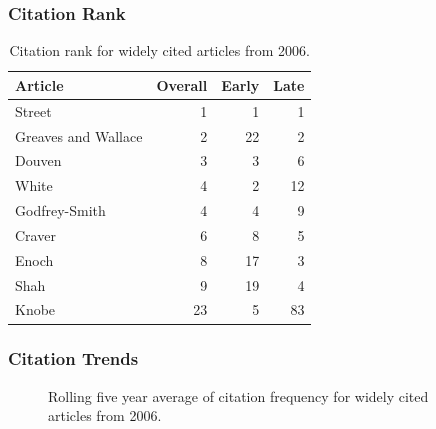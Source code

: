 \documentclass[
  10pt,
  letterpaper,
  DIV=11,
  numbers=noendperiod,
  twoside]{scrartcl}
\begin{document}
\subsubsection*{Citation Rank}\label{sec-rank-2006}

\begin{longtable}[]{@{}lrrr@{}}

\caption{\label{tbl-citation-rank-2006}Citation rank for widely cited
articles from 2006.}

\tabularnewline

\toprule\noalign{}
Article & Overall & Early & Late \\
\midrule\noalign{}
\endhead
\bottomrule\noalign{}
\endlastfoot
Street & 1 & 1 & 1 \\
Greaves and Wallace & 2 & 22 & 2 \\
Douven & 3 & 3 & 6 \\
White & 4 & 2 & 12 \\
Godfrey-Smith & 4 & 4 & 9 \\
Craver & 6 & 8 & 5 \\
Enoch & 8 & 17 & 3 \\
Shah & 9 & 19 & 4 \\
Knobe & 23 & 5 & 83 \\

\end{longtable}

\subsubsection*{Citation Trends}\label{sec-trends-2006}

\begin{figure}


\caption{\label{fig-citation-spaghetti-2006}Rolling five year average of
citation frequency for widely cited articles from 2006.}

\end{figure}%
\end{document}
